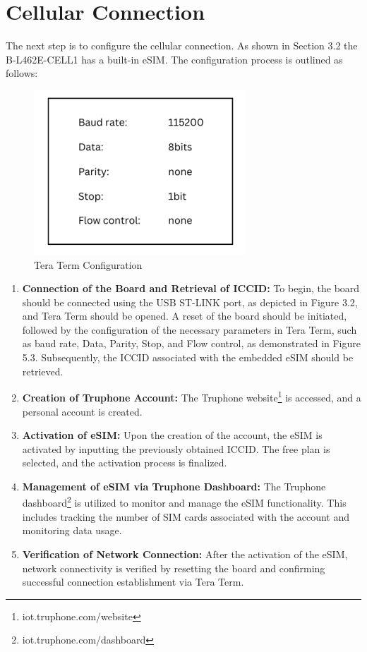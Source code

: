 \section{Cellular Connection}
The next step is to configure the cellular connection. 
As shown in Section 3.2 the B-L462E-CELL1 has a built-in eSIM.
The configuration process is outlined as follows:

\begin{figure}[H]
    \centering
    \includegraphics[width=0.25\linewidth]{TeraTerm_Configuration.png}
    \caption{Tera Term Configuration}
    \label{fig:Tera Term Configuration}
\end{figure}
    
\begin{enumerate}
    \item \textbf{Connection of the Board and Retrieval of ICCID:}
    To begin, the board should be connected using the USB ST-LINK port, as depicted in Figure 3.2, and Tera Term should be opened. A reset of the board should be initiated, followed by the configuration of the necessary parameters in Tera Term, such as baud rate, Data, Parity, Stop, and Flow control, as demonstrated in Figure 5.3. Subsequently, the ICCID associated with the embedded eSIM should be retrieved. 
    \item \textbf{Creation of Truphone Account:}
    The Truphone website\footnote{iot.truphone.com/website} is accessed, and a personal account is created. 
    \item \textbf{Activation of eSIM:}
    Upon the creation of the account, the eSIM is activated by inputting the previously obtained ICCID. The free plan is selected, and the activation process is finalized. 
    \item \textbf{Management of eSIM via Truphone Dashboard:}
    The Truphone dashboard\footnote{iot.truphone.com/dashboard} is utilized to monitor and manage the eSIM functionality. This includes tracking the number of SIM cards associated with the account and monitoring data usage.
    \item \textbf{Verification of Network Connection:}
    After the activation of the eSIM, network connectivity is verified by resetting the board and confirming successful connection establishment via Tera Term.
\end{enumerate}

